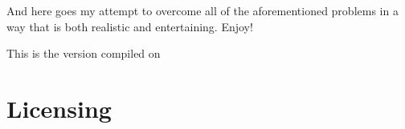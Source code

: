 And here goes my attempt to overcome all of the aforementioned problems in a way that is both realistic and entertaining. Enjoy!


This is the version compiled on \DTMToday\ \DTMcurrenttime %

\section*{Licensing}

\pdforepub{
	
\doclicenseThis

\hspace*{\fill} \qrcode[nolink,level=L,height=3cm]{\doclicenseURL}

}{\doclicenseLongText}